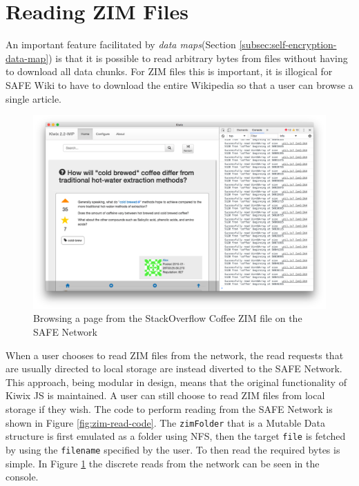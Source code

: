 \section{Reading ZIM Files}
 
An important feature facilitated by \textit{data maps}(Section \ref{subsec:self-encryption-data-map}) is that it is possible to read arbitrary bytes from files without having to download all data chunks. For ZIM files this is important, it is illogical for SAFE Wiki to have to download the entire Wikipedia so that a user can browse a single article.

\begin{figure}[h]
	\begin{center}
		\includegraphics[scale=0.6]{images/safe-wiki-browsing-coffee}
		\caption{Browsing a page from the StackOverflow Coffee ZIM file on the SAFE Network}
		\label{fig:browsing-coffee}
	\end{center}
\end{figure}

When a user chooses to read ZIM files from the network, the read requests that are usually directed to local storage are instead diverted to the SAFE Network. This approach, being modular in design, means that the original functionality of Kiwix JS is maintained. A user can still choose to read ZIM files from local storage if they wish. The code to perform reading from the SAFE Network is shown in Figure \ref{fig:zim-read-code}. The \texttt{zimFolder} that is a Mutable Data structure is first emulated as a folder using NFS, then the target \texttt{file} is fetched by using the \texttt{filename} specified by the user. To then read the required bytes is simple. In Figure \ref{fig:browsing-coffee} the discrete reads from the network can be seen in the console.

